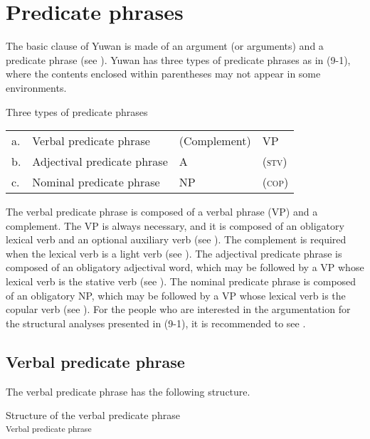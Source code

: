 \chapter{Predicate phrases}\label{chap:9}

The basic clause of Yuwan is made of an argument (or arguments) and a predicate phrase (see ). Yuwan has three types of predicate phrases as in (9-1), where the contents enclosed within parentheses may not appear in some environments.

\ea   Three types of predicate phrases \label{ex:9.1}
  \begin{tabular}{@{}l@{ }lll@{}}
  a. & Verbal predicate phrase      &  (Complement)         &  VP\footnotemark[1]\\
  b. & Adjectival predicate phrase  &  A\footnotemark[2]    & (\textsc{stv}\footnotemark[3])\\
  c. & Nominal predicate phrase     &  NP                   & (\textsc{cop}\footnotemark[4])\\
  \end{tabular}
\z
{}

The verbal predicate phrase is composed of a verbal phrase (VP) and a complement. The VP is always necessary, and it is composed of an obligatory lexical verb and an optional auxiliary verb (see ). The complement is required when the lexical verb is a light verb (see ). The adjectival predicate phrase is composed of an obligatory adjectival word, which may be followed by a VP whose lexical verb is the stative verb (see ). The nominal predicate phrase is composed of an obligatory NP, which may be followed by a VP whose lexical verb is the copular verb (see ). For the people who are interested in the argumentation for the structural analyses presented in (9-1), it is recommended to see .

\section{Verbal predicate phrase}\label{sec:9.1}

The verbal predicate phrase has the following structure.

\ea   Structure of the verbal predicate phrase \label{ex:9.2}\\\textsubscript{Verbal predicate phrase}
\z

